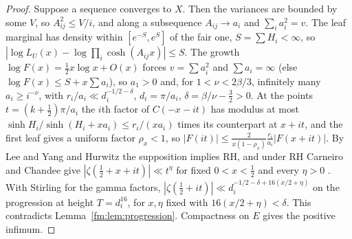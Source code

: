 \begin{proof}
Suppose a sequence converges to $X$. Then the variances are bounded by some $V$, so $A_{ij}^2\le V/i$, and along a subsequence $A_{ij}\to a_i$ and $\sum_ia_i^2=v$. The leaf marginal has density within $[e^{-S},e^S]$ of the fair one, $S=\sum H_i<\infty$, so $|\log L_U(x)-\log\prod_i\cosh(A_{ij}x)|\le S$. The growth $\log F(x)=\frac12x\log x+O(x)$ forces $v=\sum a_i^2$ and $\sum a_i=\infty$ (else $\log F(x)\le S+x\sum a_i$), so $a_1>0$ and, for $1<\nu<2\beta/3$, infinitely many $a_i\ge i^{-\nu}$, with $r_i/a_i\ll d_i^{-1/2-\delta}$, $d_i=\pi/a_i$, $\delta=\beta/\nu-\frac32>0$. At the points $t=(k+\frac12)\pi/a_i$ the $i$th factor of $C(-x-it)$ has modulus at most $\sinh H_i/\sinh(H_i+xa_i)\le r_i/(xa_i)$ times its counterpart at $x+it$, and the first leaf gives a uniform factor $\rho_x<1$, so $|F(it)|\le\frac2{x(1-\rho_x)}\frac{r_i}{a_i}|F(x+it)|$. By Lee and Yang and Hurwitz the supposition implies RH, and under RH Carneiro and Chandee give $|\zeta(\frac12+x+it)|\ll t^\eta$ for fixed $0<x<\frac12$ and every $\eta>0$ %
. With Stirling for the gamma factors, $|\zeta(\frac12+it)|\ll d_i^{-1/2-\delta+16(x/2+\eta)}$ on the progression at height $T=d_i^{16}$, for $x,\eta$ fixed with $16(x/2+\eta)<\delta$. This contradicts Lemma~\ref{fm:lem:progression}. Compactness on $E$ gives the positive infimum.
\end{proof}


